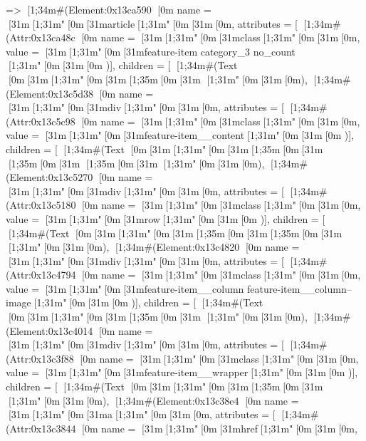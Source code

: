 => [1;34m#(Element:0x13ca590 {[0m
  name = [31m[1;31m"[0m[31marticle[1;31m"[0m[31m[0m,
  attributes = [ [1;34m#(Attr:0x13ca48c {[0m name = [31m[1;31m"[0m[31mclass[1;31m"[0m[31m[0m, value = [31m[1;31m"[0m[31mfeature-item category_3   no_count  [1;31m"[0m[31m[0m })],
  children = [
    [1;34m#(Text [0m[31m[1;31m"[0m[31m[1;35m\n[0m[31m    [1;31m"[0m[31m[0m),
    [1;34m#(Element:0x13c5d38 {[0m
      name = [31m[1;31m"[0m[31mdiv[1;31m"[0m[31m[0m,
      attributes = [ [1;34m#(Attr:0x13c5c98 {[0m name = [31m[1;31m"[0m[31mclass[1;31m"[0m[31m[0m, value = [31m[1;31m"[0m[31mfeature-item__content[1;31m"[0m[31m[0m })],
      children = [
        [1;34m#(Text [0m[31m[1;31m"[0m[31m[1;35m\n[0m[31m        [1;35m\n[0m[31m                                [1;35m\n[0m[31m    [1;31m"[0m[31m[0m),
        [1;34m#(Element:0x13c5270 {[0m
          name = [31m[1;31m"[0m[31mdiv[1;31m"[0m[31m[0m,
          attributes = [ [1;34m#(Attr:0x13c5180 {[0m name = [31m[1;31m"[0m[31mclass[1;31m"[0m[31m[0m, value = [31m[1;31m"[0m[31mrow[1;31m"[0m[31m[0m })],
          children = [
            [1;34m#(Text [0m[31m[1;31m"[0m[31m[1;35m\n[0m[31m[1;35m\n[0m[31m                    [1;31m"[0m[31m[0m),
            [1;34m#(Element:0x13c4820 {[0m
              name = [31m[1;31m"[0m[31mdiv[1;31m"[0m[31m[0m,
              attributes = [
                [1;34m#(Attr:0x13c4794 {[0m
                  name = [31m[1;31m"[0m[31mclass[1;31m"[0m[31m[0m,
                  value = [31m[1;31m"[0m[31mfeature-item__column feature-item__column--image[1;31m"[0m[31m[0m
                  })],
              children = [
                [1;34m#(Text [0m[31m[1;31m"[0m[31m[1;35m\n[0m[31m                [1;31m"[0m[31m[0m),
                [1;34m#(Element:0x13c4014 {[0m
                  name = [31m[1;31m"[0m[31mdiv[1;31m"[0m[31m[0m,
                  attributes = [
                    [1;34m#(Attr:0x13c3f88 {[0m name = [31m[1;31m"[0m[31mclass[1;31m"[0m[31m[0m, value = [31m[1;31m"[0m[31mfeature-item__wrapper[1;31m"[0m[31m[0m })],
                  children = [
                    [1;34m#(Text [0m[31m[1;31m"[0m[31m[1;35m\n[0m[31m                                    [1;31m"[0m[31m[0m),
                    [1;34m#(Element:0x13c38e4 {[0m
                      name = [31m[1;31m"[0m[31ma[1;31m"[0m[31m[0m,
                      attributes = [
                        [1;34m#(Attr:0x13c3844 {[0m
                          name = [31m[1;31m"[0m[31mhref[1;31m"[0m[31m[0m,
}}}}}}}
